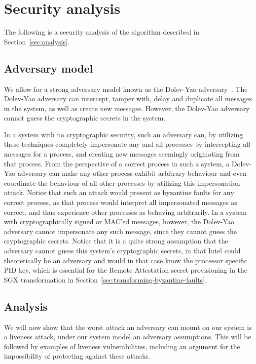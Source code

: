 \documentclass{article}
\begin{document}
	\section{Security analysis}
    \label{sec:security-analysis}

	The following is a security analysis of the algorithm described in Section~\ref{sec:analysis}.

		\subsection{Adversary model}

		We allow for a strong adversary model known as the Dolev-Yao adversary~\cite{dolev_security_1983}.
		The Dolev-Yao adversary can intercept, tamper with, delay and duplicate all messages in the system, as well as create new messages.
		However, the Dolev-Yao adversary cannot guess the cryptographic secrets in the system.

		In a system with no cryptographic security, such an adversary can, by utilizing these techniques completely impersonate any and all processes by intercepting all messages for a process, and creating new messages seemingly originating from that process.
		From the perspective of a correct process in such a system, a Dolev-Yao adversary can make any other process exhibit arbitrary behaviour and even coordinate the behaviour of all other processes by utilizing this impersonation attack.
		Notice that such an attack would present as byzantine faults for any correct process, as that process would interpret all impersonated messages as correct, and thus experience other processes as behaving arbitrarily.
		In a system with cryptographically signed or MAC'ed messages, however, the Dolev-Yao adversary cannot impersonate any such message, since they cannot guess the cryptographic secrets.
		Notice that it is a quite strong assumption that the adversary cannot guess this system's cryptographic secrets, in that Intel could theoretically be an adversary and would in that case know the processor specific PID key, which is essential for the Remote Attestation secret provisioning in the SGX transformation in Section~\ref{sec:transforming-byzantine-faults}.

		\subsection{Analysis}
        We will now show that the worst attack an adversary can mount on our system is a liveness attack, under our system model an adversary assumptions.
        This will be followed by examples of liveness vulnerabilities, including an argument for the impossibility of protecting against these attacks.
\end{document}
